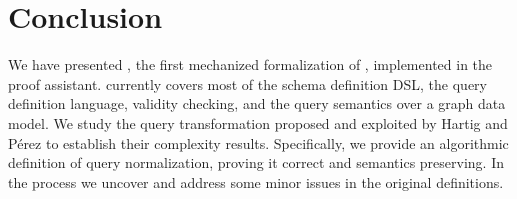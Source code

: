 \section{Conclusion}
\label{sec:conclusion}

We have presented \gcoql, the first mechanized formalization of \gql, 
implemented in the \coq proof assistant. 
\gcoql currently covers most of the schema definition DSL, the query definition language, validity checking, and the query semantics over a graph data model. We study the query transformation proposed and exploited by Hartig and P{\'e}rez to establish their complexity results. Specifically, we provide an algorithmic definition of query normalization, proving it correct and semantics preserving. In the process we uncover and address some minor issues in the original definitions.

